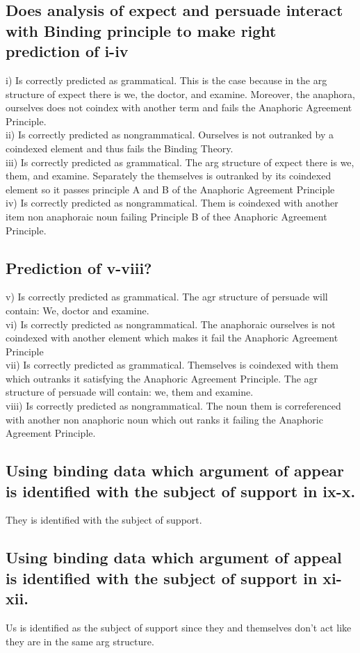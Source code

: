 \documentclass{article}
\begin{document}
\subsection{Does analysis of expect and persuade interact with Binding principle to make right prediction of i-iv}
i) Is correctly predicted as grammatical. This is the case because in the arg structure of expect there is we, the doctor, and examine.  Moreover, the anaphora, ourselves does not coindex with another term and fails the Anaphoric Agreement Principle. \\
ii) Is correctly predicted as nongrammatical. Ourselves is not outranked by a coindexed element and thus fails the Binding Theory. \\
iii) Is correctly predicted as grammatical. The arg structure of expect there is we, them, and examine. Separately the themselves is outranked by its coindexed element so it passes principle A and B of the Anaphoric Agreement Principle \\
iv) Is correctly predicted as nongrammatical. Them is coindexed with another item non anaphoraic noun failing Principle B of thee Anaphoric Agreement Principle.
\subsection{Prediction of v-viii?}
v) Is correctly predicted as grammatical. The agr structure of persuade will contain: We, doctor and examine. \\
vi) Is correctly predicted as nongrammatical. The anaphoraic ourselves is not coindexed with another element which makes it fail the Anaphoric Agreement Principle \\
vii) Is correctly predicted as grammatical. Themselves is coindexed with them which outranks it satisfying the Anaphoric Agreement Principle. The agr structure of persuade will contain: we, them and examine. \\
viii) Is correctly predicted as nongrammatical. The noun them is correferenced with another non anaphoric noun which out ranks it failing the Anaphoric Agreement Principle. \\
\subsection{Using binding data which argument of appear is identified with the subject of support in ix-x.}
They is identified with the subject of support.
\subsection{Using binding data which argument of appeal is identified with the subject of support in xi-xii.}
Us is identified as the subject of support since they and themselves don't act like they are in the same arg structure.
\end{document}

